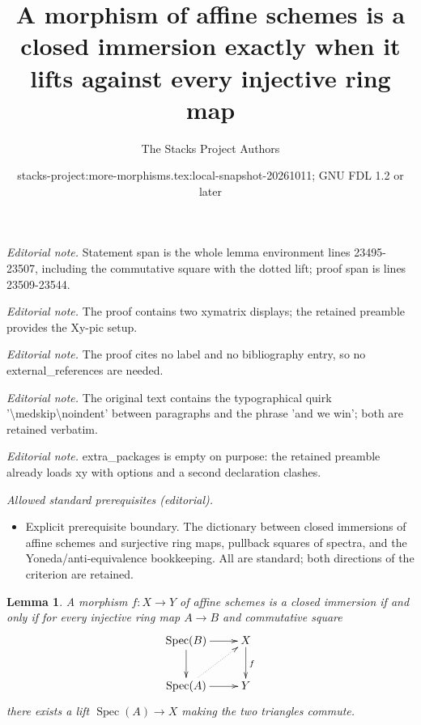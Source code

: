 \documentclass[10pt,a4paper]{amsart}
\title{A morphism of affine schemes is a closed immersion exactly when it lifts against every injective ring map}
\author{The Stacks Project Authors}
\date{stacks-project:more-morphisms.tex:local-snapshot-20261011; GNU FDL 1.2 or later}
\theoremstyle{plain}
\newtheorem{lemma}[subsection]{Lemma}
\theoremstyle{definition}
\theoremstyle{remark}
\numberwithin{equation}{subsection}
\def\Spec{\mathop{\mathrm{Spec}}}
\begin{document}
\maketitle
\noindent\textit{Editorial note.} Statement span is the whole lemma environment lines 23495-23507, including the commutative square with the dotted lift; proof span is lines 23509-23544.\par\medskip
\noindent\textit{Editorial note.} The proof contains two xymatrix displays; the retained preamble provides the Xy-pic setup.\par\medskip
\noindent\textit{Editorial note.} The proof cites no label and no bibliography entry, so no external\_references are needed.\par\medskip
\noindent\textit{Editorial note.} The original text contains the typographical quirk '\textbackslash{}medskip\textbackslash{}noindent' between paragraphs and the phrase 'and we win'; both are retained verbatim.\par\medskip
\noindent\textit{Editorial note.} extra\_packages is empty on purpose: the retained preamble already loads xy with options and a second declaration clashes.\par\medskip
\noindent\textit{Allowed standard prerequisites (editorial).}\begin{itemize}
\item Explicit prerequisite boundary. The dictionary between closed immersions of affine schemes and surjective ring maps, pullback squares of spectra, and the Yoneda/anti-equivalence bookkeeping. All are standard; both directions of the criterion are retained.
\end{itemize}\medskip
\begin{lemma}
\label{lemma-affine-extensive-criterion}
A morphism $f : X \to Y$ of affine schemes is a closed immersion 
if and only if for every injective ring map $A \to B$ and commutative 
square
$$
\xymatrix{
\Spec(B) \ar[d] \ar[r] & X \ar[d]^f \\
\Spec(A) \ar[r] \ar@{..>}[ur] & Y
}
$$
there exists a lift $\Spec(A) \to X$ making the two triangles commute.
\end{lemma}
\end{document}
